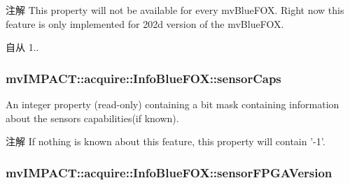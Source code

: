 \begin{DoxyNote}{注解}
This property will not be available for every mv\+Blue\+F\+O\+X. Right now this feature is only implemented for 202d version of the mv\+Blue\+F\+O\+X.
\end{DoxyNote}
\begin{DoxySince}{自从}
1.. 
\end{DoxySince}
\hypertarget{classmv_i_m_p_a_c_t_1_1acquire_1_1_info_blue_f_o_x_af1b01c915e47ab797ce087f6a2eec2c9}{
\subsubsection[{sensor\+Caps}]{ mv\+I\+M\+P\+A\+C\+T\+::acquire\+::\+Info\+Blue\+F\+O\+X\+::sensor\+Caps}}\label{classmv_i_m_p_a_c_t_1_1acquire_1_1_info_blue_f_o_x_af1b01c915e47ab797ce087f6a2eec2c9}


An integer property {\bfseries }(read-\/only) containing a bit mask containing information about the sensors capabilities(if known). 

\begin{DoxyNote}{注解}
If nothing is known about this feature, this property will contain '-\/1'. 
\end{DoxyNote}
\hypertarget{classmv_i_m_p_a_c_t_1_1acquire_1_1_info_blue_f_o_x_a571b20bb38f76c76728e0784b23e78a4}{
\subsubsection[{sensor\+F\+P\+G\+A\+Version}]{ mv\+I\+M\+P\+A\+C\+T\+::acquire\+::\+Info\+Blue\+F\+O\+X\+::sensor\+F\+P\+G\+A\+Version}}\label{classmv_i_m_p_a_c_t_1_1acquire_1_1_info_blue_f_o_x_a571b20bb38f76c76728e0784b23e78a4}



